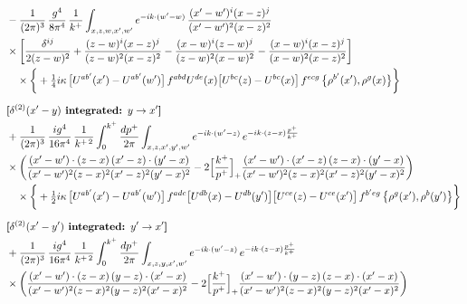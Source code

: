 \documentclass[10pt]{article}
\numberwithin{equation}{section}
\begin{document}
\begin{align}
&-\frac{1}{(2\pi)^{3}}\,\frac{g^{4}}{8\pi^{4}}\,\frac{1}{k^{+}}\int_{x,z,w,x^{\prime},w^{\prime}}e^{-ik\cdot(w^{\prime}-w)}\,\frac{(x^{\prime}-w^{\prime})^{i}(x-z)^{j}}{(x^{\prime}-w^{\prime})^{2}(x-z)^{2}}\notag\\
&\times\bigg[\frac{\delta^{ij}}{2(z-w)^{2}}+\frac{(z-w)^{i}(x-z)^{j}}{(z-w)^{2}(x-z)^{2}}-\frac{(x-w)^{i}(z-w)^{j}}{(z-w)^{2}(x-w)^{2}}-\frac{(x-w)^{i}(x-z)^{j}}{(x-w)^{2}(x-z)^{2}}\bigg]\notag\\
&\quad\times\bigg\{+\tfrac14 i\kappa\,\big[U^{ab^{\prime}}(x^{\prime})-U^{ab^{\prime}}(w^{\prime})\big]\,f^{abd}U^{de}(x)\big[U^{bc}(z)-U^{bc}(x)\big]\,f^{ecg}\,\big\{\rho^{b^{\prime}}(x^{\prime}),\rho^{g}(x)\big\}\bigg\}\notag\\[6pt]
&\textbf{[$\delta^{(2)}(x^{\prime}-y)$ integrated: $y\to x^{\prime}$]}\notag\\
&+\frac{1}{(2\pi)^{3}}\,\frac{ig^{4}}{16\pi^{4}}\,\frac{1}{k^{+\,2}}\int_{0}^{k^{+}}\frac{dp^{+}}{2\pi}\int_{x,z,x^{\prime},y^{\prime},w^{\prime}}e^{-ik\cdot(w^{\prime}-z)}\,e^{-ik\cdot(z-x)\frac{p^{+}}{k^{+}}}\notag\\
&\times\bigg(\frac{(x^{\prime}-w^{\prime})\cdot(z-x)\,(x^{\prime}-z)\cdot(y^{\prime}-x)}{(x^{\prime}-w^{\prime})^{2}(z-x)^{2}(x^{\prime}-z)^{2}(y^{\prime}-x)^{2}}-2\Big[\frac{k^{+}}{p^{+}}\Big]_{+}\frac{(x^{\prime}-w^{\prime})\cdot(x^{\prime}-z)\,(z-x)\cdot(y^{\prime}-x)}{(x^{\prime}-w^{\prime})^{2}(z-x)^{2}(x^{\prime}-z)^{2}(y^{\prime}-x)^{2}}\bigg)\notag\\
&\quad\times\bigg\{+\tfrac12 i\kappa\,\big[U^{ab^{\prime}}(x^{\prime})-U^{ab^{\prime}}(w^{\prime})\big]\,f^{adc}\big[U^{db}(x)-U^{db}(y^{\prime})\big]\big[U^{ce}(z)-U^{ce}(x^{\prime})\big]\,f^{b^{\prime}eg}\,\big\{\rho^{g}(x^{\prime}),\rho^{b}(y^{\prime})\big\}\bigg\}\notag\\[6pt]
&\textbf{[$\delta^{(2)}(x^{\prime}-y^{\prime})$ integrated: $y^{\prime}\to x^{\prime}$]}\notag\\
&+\frac{1}{(2\pi)^{3}}\,\frac{ig^{4}}{16\pi^{4}}\,\frac{1}{k^{+\,2}}\int_{0}^{k^{+}}\frac{dp^{+}}{2\pi}\int_{x,z,y,x^{\prime},w^{\prime}}e^{-ik\cdot(w^{\prime}-z)}\,e^{-ik\cdot(z-x)\frac{p^{+}}{k^{+}}}\notag\\
&\times\bigg(\frac{(x^{\prime}-w^{\prime})\cdot(z-x)\,(y-z)\cdot(x^{\prime}-x)}{(x^{\prime}-w^{\prime})^{2}(z-x)^{2}(y-z)^{2}(x^{\prime}-x)^{2}}-2\Big[\frac{k^{+}}{p^{+}}\Big]_{+}\frac{(x^{\prime}-w^{\prime})\cdot(y-z)\,(z-x)\cdot(x^{\prime}-x)}{(x^{\prime}-w^{\prime})^{2}(z-x)^{2}(y-z)^{2}(x^{\prime}-x)^{2}}\bigg)\notag\\

\end{align}
\end{document}
